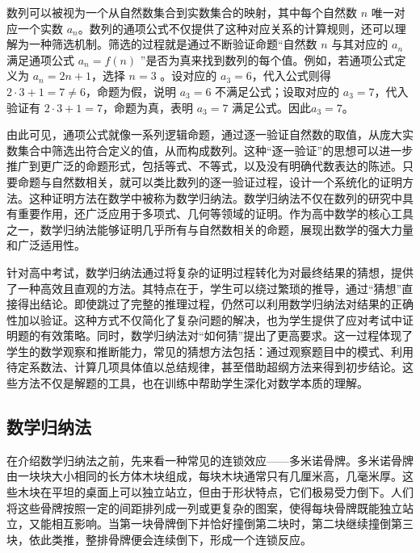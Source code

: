 

数列可以被视为一个从自然数集合到实数集合的映射，其中每个自然数 $n$ 唯一对应一个实数 $a_n$。数列的通项公式不仅提供了这种对应关系的计算规则，还可以理解为一种筛选机制。筛选的过程就是通过不断验证命题“自然数 $n$ 与其对应的 $a_n$满足通项公式 $a_n = f(n)$ ”是否为真来找到数列的每个值。例如，若通项公式定义为 $a_n = 2n + 1$，选择 $n = 3$ 。设对应的 $a_3 = 6$，代入公式则得 $2 \cdot 3 + 1 = 7 \neq 6$，命题为假，说明 $a_3 = 6$ 不满足公式；设取对应的 $a_3 = 7$，代入验证有 $2 \cdot 3 + 1 = 7$，命题为真，表明 $a_3 = 7$ 满足公式。因此$a_3=7$。

由此可见，通项公式就像一系列逻辑命题，通过逐一验证自然数的取值，从庞大实数集合中筛选出符合定义的值，从而构成数列。这种“逐一验证”的思想可以进一步推广到更广泛的命题形式，包括等式、不等式，以及没有明确代数表达的陈述。只要命题与自然数相关，就可以类比数列的逐一验证过程，设计一个系统化的证明方法。这种证明方法在数学中被称为数学归纳法。数学归纳法不仅在数列的研究中具有重要作用，还广泛应用于多项式、几何等领域的证明。作为高中数学的核心工具之一，数学归纳法能够证明几乎所有与自然数相关的命题，展现出数学的强大力量和广泛适用性。

针对高中考试，数学归纳法通过将复杂的证明过程转化为对最终结果的猜想，提供了一种高效且直观的方法。其特点在于，学生可以绕过繁琐的推导，通过“猜想”直接得出结论。即使跳过了完整的推理过程，仍然可以利用数学归纳法对结果的正确性加以验证。这种方式不仅简化了复杂问题的解决，也为学生提供了应对考试中证明题的有效策略。同时，数学归纳法对“如何猜”提出了更高要求。这一过程体现了学生的数学观察和推断能力，常见的猜想方法包括：通过观察题目中的模式、利用待定系数法、计算几项具体值以总结规律，甚至借助超纲方法来得到初步结论。这些方法不仅是解题的工具，也在训练中帮助学生深化对数学本质的理解。

\subsection{数学归纳法}

在介绍数学归纳法之前，先来看一种常见的连锁效应——多米诺骨牌。多米诺骨牌由一块块大小相同的长方体木块组成，每块木块通常只有几厘米高，几毫米厚。这些木块在平坦的桌面上可以独立站立，但由于形状特点，它们极易受力倒下。人们将这些骨牌按照一定的间距排列成一列或更复杂的图案，使得每块骨牌既能独立站立，又能相互影响。当第一块骨牌倒下并恰好撞倒第二块时，第二块继续撞倒第三块，依此类推，整排骨牌便会连续倒下，形成一个连锁反应。


